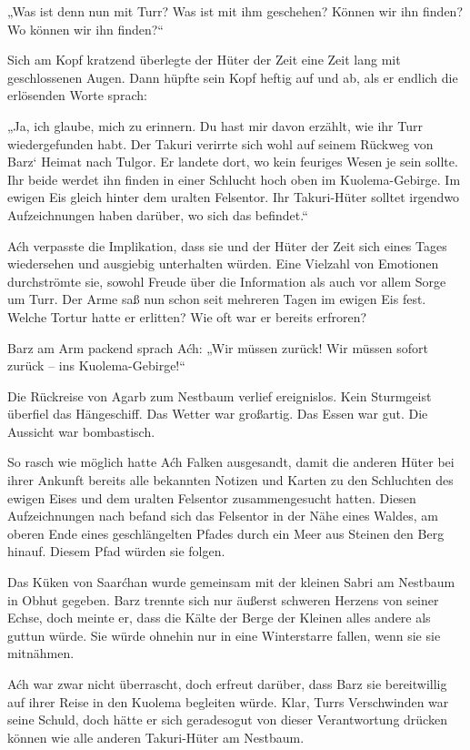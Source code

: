 „Was ist denn nun mit Turr? Was ist mit ihm geschehen? Können wir ihn finden? Wo können wir ihn finden?“

Sich am Kopf kratzend überlegte der Hüter der Zeit eine Zeit lang mit geschlossenen Augen. Dann hüpfte sein Kopf heftig auf und ab, als er endlich die erlösenden Worte sprach:

„Ja, ich glaube, mich zu erinnern. Du hast mir davon erzählt, wie ihr Turr wiedergefunden habt. Der Takuri verirrte sich wohl auf seinem Rückweg von Barz‘ Heimat nach Tulgor. Er landete dort, wo kein feuriges Wesen je sein sollte. Ihr beide werdet ihn finden in einer Schlucht hoch oben im Kuolema-Gebirge. Im ewigen Eis gleich hinter dem uralten Felsentor. Ihr Takuri-Hüter solltet irgendwo Aufzeichnungen haben darüber, wo sich das befindet.“

Aćh verpasste die Implikation, dass sie und der Hüter der Zeit sich eines Tages wiedersehen und ausgiebig unterhalten würden. Eine Vielzahl von Emotionen durchströmte sie, sowohl Freude über die Information als auch vor allem Sorge um Turr. Der Arme saß nun schon seit mehreren Tagen im ewigen Eis fest. Welche Tortur hatte er erlitten? Wie oft war er bereits erfroren?

Barz am Arm packend sprach Aćh: „Wir müssen zurück! Wir müssen sofort zurück – ins Kuolema-Gebirge!“



\trennzeichen



Die Rückreise von Agarb zum Nestbaum verlief ereignislos. Kein Sturmgeist überfiel das Hängeschiff. Das Wetter war großartig. Das Essen war gut. Die Aussicht war bombastisch.

So rasch wie möglich hatte Aćh Falken ausgesandt, damit die anderen Hüter bei ihrer Ankunft bereits alle bekannten Notizen und Karten zu den Schluchten des ewigen Eises und dem uralten Felsentor zusammengesucht hatten. Diesen Aufzeichnungen nach befand sich das Felsentor in der Nähe eines Waldes, am oberen Ende eines geschlängelten Pfades durch ein Meer aus Steinen den Berg hinauf. Diesem Pfad würden sie folgen.

Das Küken von Saarćhan wurde gemeinsam mit der kleinen Sabri am Nestbaum in Obhut gegeben. Barz trennte sich nur äußerst schweren Herzens von seiner Echse, doch meinte er, dass die Kälte der Berge der Kleinen alles andere als guttun würde. Sie würde ohnehin nur in eine Winterstarre fallen, wenn sie sie mitnähmen.

Aćh war zwar nicht überrascht, doch erfreut darüber, dass Barz sie bereitwillig auf ihrer Reise in den Kuolema begleiten würde. Klar, Turrs Verschwinden war seine Schuld, doch hätte er sich geradesogut von dieser Verantwortung drücken können wie alle anderen Takuri-Hüter am Nestbaum.

